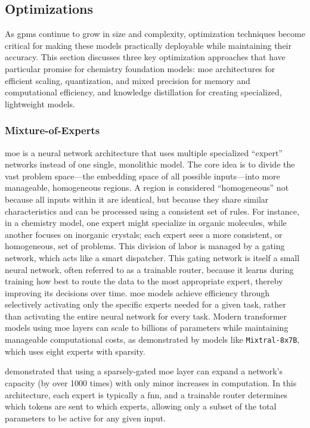 \documentclass[11pt, oneside]{article}
\newcommand{\modelname}[1]{\texttt{#1}}
\providecommand{\DIFaddtex}[1]{{\protect\color{blue}\uwave{#1}}} %
\providecommand{\DIFaddbegin}{} %
\providecommand{\DIFaddend}{} %
\providecommand{\DIFadd}[1]{\texorpdfstring{\DIFaddtex{#1}}{#1}} %
\newcommand{\DIFaddincludegraphics}[2][]{{\color{blue}\fbox{\DIFOincludegraphics[#1]{#2}}}} %
\DeclareRobustCommand{\DIFaddbegin}{\DIFOaddbegin \let\includegraphics\DIFaddincludegraphics} %
\DeclareRobustCommand{\DIFaddend}{\DIFOaddend \let\includegraphics\DIFOincludegraphics} %
\begin{document}
\subsection{Optimizations}

As \glspl{gpm} continue to grow in size and complexity, optimization techniques \DIFaddbegin \DIFadd{(performance or resource consumptions optimization) }\DIFaddend become critical for making these models practically deployable while maintaining their accuracy. 
This section discusses three key optimization approaches that have particular promise for chemistry foundation models: \gls{moe} architectures for efficient scaling, quantization, and mixed precision for memory and computational efficiency, and knowledge distillation for creating specialized, lightweight models.


\subsubsection{Mixture-of-Experts} \label{sec:arch-moes}
\gls{moe} is a neural network architecture that uses multiple specialized \enquote{expert} networks instead of one single, monolithic model. The core idea is to divide the vast problem space---the embedding space of all possible inputs---into more manageable, homogeneous regions. A region is considered \enquote{homogeneous} not because all inputs within it are identical, but because they share similar characteristics and can be processed using a consistent set of rules. For instance, in a chemistry model, one expert might specialize in organic molecules, while another focuses on inorganic crystals; each expert sees a more consistent, or homogeneous, set of problems. This division of labor is managed by a gating network, which acts like a smart dispatcher. This gating network is itself a small neural network, often referred to as a trainable router, because it learns during training how best to route the data to the most appropriate expert, thereby improving its decisions over time.
\gls{moe} models achieve efficiency through selectively activating only the specific experts needed for a given task, rather than activating the entire neural network for every task. Modern transformer models using \gls{moe} layers can scale to billions of parameters while maintaining manageable computational costs, as demonstrated by models like \modelname{Mixtral-8x7B}\DIFaddbegin \autocite{jiang2024mixtral}\DIFaddend , which uses eight experts with sparsity.

\textcite{shazeer2017outrageously} demonstrated that using a sparsely-gated \gls{moe} layer can expand a network’s capacity (by over 1000 times) with only minor increases in computation. In this architecture, each expert is typically a \gls{fnn}, and a trainable router determines which tokens are sent to which experts, allowing only a subset of the total parameters to be active for any given input. 
\end{document}
